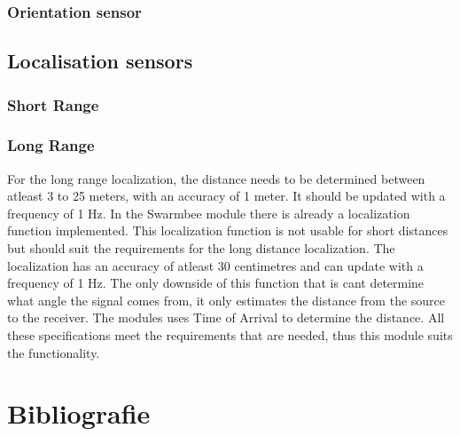 \documentclass[10pt,a4paper]{article}
\begin{document}
\subsubsection{Orientation sensor}

\subsection{Localisation sensors}


\subsubsection{Short Range}




\subsubsection{Long Range}

For the long range localization, the distance needs to be determined between atleast 3 to 25 meters, with an accuracy of 1 meter. It should be updated with a frequency of 1 Hz. In the Swarmbee module there is already a localization function implemented. This localization function is not usable for short distances but should suit the requirements for the long distance localization. The localization has an accuracy of atleast 30 centimetres and can update with a frequency of 1 Hz. The only downside of this function that is cant determine what angle the signal comes from, it only estimates the distance from the source to the receiver. The modules uses Time of Arrival to determine the distance. All these specifications meet the requirements that are needed, thus this module suits the functionality. 




\section{Bibliografie}


\end{document}
